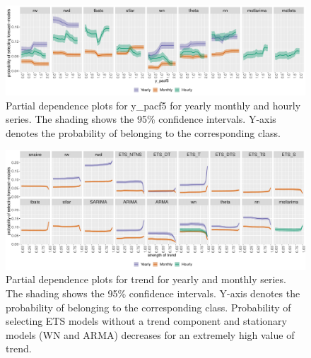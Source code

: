 \documentclass[11pt,a4paper,]{article}
\begin{document}
\begin{figure}[h]

{\centering \includegraphics[width=\textwidth]{figure/ypacf5-1} 

}

\caption{Partial dependence plots for y\_pacf5 for yearly monthly and hourly series. The shading shows the 95\% confidence intervals. Y-axis denotes the probability of belonging to the corresponding class. }\label{fig:ypacf5}
\end{figure}

\begin{figure}[h]

{\centering \includegraphics[width=\textwidth]{figure/pdpyearlytrend-1} 

}

\caption{Partial dependence plots for trend for yearly and monthly series. The shading shows the 95\% confidence intervals. Y-axis denotes the probability of belonging to the corresponding class. Probability of selecting ETS models without a trend component and stationary models (WN and ARMA) decreases for an extremely high value of trend.}\label{fig:pdpyearlytrend}
\end{figure}
\end{document}
